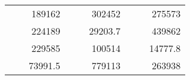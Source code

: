 \begin{table}[H]
\begin{tabular}{|ccrccrccc}
\rowcolor[HTML]{DAE8FC} 
\multicolumn{1}{|c|}{\cellcolor[HTML]{FFFFC7}}                                & \multicolumn{1}{c|}{\cellcolor[HTML]{DAE8FC}}                      & \multicolumn{1}{r|}{\cellcolor[HTML]{DAE8FC}189162}    & \multicolumn{1}{c|}{\cellcolor[HTML]{FFFFC7}}                                & \multicolumn{1}{c|}{\cellcolor[HTML]{DAE8FC}}                       & \multicolumn{1}{r|}{\cellcolor[HTML]{DAE8FC}302452}    & \multicolumn{1}{c|}{\cellcolor[HTML]{FFFFC7}}                                & \multicolumn{1}{c|}{\cellcolor[HTML]{DAE8FC}}                      & \multicolumn{1}{r|}{\cellcolor[HTML]{DAE8FC}275573}    \\ \cline{3-3} \cline{6-6} \cline{9-9} 
\multicolumn{1}{|c|}{\cellcolor[HTML]{FFFFC7}}                                & \multicolumn{1}{c|}{\cellcolor[HTML]{DAE8FC}}                      & \multicolumn{1}{r|}{\cellcolor[HTML]{DDFDFF}224189}    & \multicolumn{1}{c|}{\cellcolor[HTML]{FFFFC7}}                                & \multicolumn{1}{c|}{\cellcolor[HTML]{DAE8FC}}                       & \multicolumn{1}{r|}{\cellcolor[HTML]{DDFDFF}29203.7}   & \multicolumn{1}{c|}{\cellcolor[HTML]{FFFFC7}}                                & \multicolumn{1}{c|}{\cellcolor[HTML]{DAE8FC}}                      & \multicolumn{1}{r|}{\cellcolor[HTML]{DDFDFF}439862}    \\ \cline{3-3} \cline{6-6} \cline{9-9} 
\rowcolor[HTML]{DAE8FC} 
\multicolumn{1}{|c|}{\cellcolor[HTML]{FFFFC7}}                                & \multicolumn{1}{c|}{\cellcolor[HTML]{DAE8FC}}                      & \multicolumn{1}{r|}{\cellcolor[HTML]{DAE8FC}229585}    & \multicolumn{1}{c|}{\cellcolor[HTML]{FFFFC7}}                                & \multicolumn{1}{c|}{\cellcolor[HTML]{DAE8FC}}                       & \multicolumn{1}{r|}{\cellcolor[HTML]{DAE8FC}100514}    & \multicolumn{1}{c|}{\cellcolor[HTML]{FFFFC7}}                                & \multicolumn{1}{c|}{\cellcolor[HTML]{DAE8FC}}                      & \multicolumn{1}{r|}{\cellcolor[HTML]{DAE8FC}14777.8}   \\ \cline{3-3} \cline{6-6} \cline{9-9} 
\multicolumn{1}{|c|}{\cellcolor[HTML]{FFFFC7}}                                & \multicolumn{1}{c|}{\cellcolor[HTML]{DAE8FC}}                      & \multicolumn{1}{r|}{\cellcolor[HTML]{DDFDFF}73991.5}   & \multicolumn{1}{c|}{\cellcolor[HTML]{FFFFC7}}                                & \multicolumn{1}{c|}{\cellcolor[HTML]{DAE8FC}}                       & \multicolumn{1}{r|}{\cellcolor[HTML]{DDFDFF}779113}    & \multicolumn{1}{c|}{\cellcolor[HTML]{FFFFC7}}                                & \multicolumn{1}{c|}{\cellcolor[HTML]{DAE8FC}}                      & \multicolumn{1}{r|}{\cellcolor[HTML]{DDFDFF}263938}    \\ \cline{3-3} \cline{6-6} \cline{9-9} 

\end{tabular}
\end{table}
